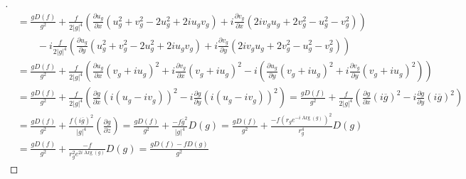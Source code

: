 \documentclass{article}
\begin{document}
\begin{proof}[\unskip \nopunct]
\begin{align*}
      &=\frac{g D(f)}{g^2} + \frac{f}{2|g|^4}\left(\frac{\partial u_g}{\partial x}(u_g^2 + v_g^2 - 2u_g^2 + 2iu_gv_g) + i\frac{\partial v_g}{\partial x}(2iv_gu_g + 2v_g^2 -u_g^2 - v_g^2)\right) \\ &\qquad -i\frac{f}{2|g|^4}\left(\frac{\partial u_g}{\partial y}(u_g^2 + v_g^2 - 2u_g^2 + 2iu_gv_g) + i\frac{\partial v_g}{\partial y}(2iv_gu_g + 2v_g^2 -u_g^2 - v_g^2)\right)\\
      &= \frac{g D(f)}{g^2} + \frac{f}{2|g|^4}\left(\frac{\partial u_g}{\partial x}(v_g +iu_g)^2 + i\frac{\partial v_g}{\partial x}(v_g +iu_g)^2 -i\left(\frac{\partial u_g}{\partial y}(v_g +iu_g)^2 + i\frac{\partial v_g}{\partial y}(v_g +iu_g)^2\right)\right)\\
      &= \frac{g D(f)}{g^2} + \frac{f}{2|g|^4}\left(\frac{\partial g}{\partial x}(i(u_g - iv_g))^2 -i\frac{\partial g}{\partial y}(i(u_g - iv_g))^2 \right) = \frac{g D(f)}{g^2} + \frac{f}{2|g|^4}\left(\frac{\partial g}{\partial x}(i\overline{g})^2 - i\frac{\partial g}{\partial y}(i\overline{g})^2\right) \\
      &=\frac{g D(f)}{g^2} + \frac{f(i\overline{g})^2}{|g|^4}\left(\frac{\partial g}{\partial z}\right)  =  \frac{g D(f)}{g^2} + \frac{-f\overline{g}^2}{|g|^4}D(g) =  \frac{g D(f)}{g^2} + \frac{-f(r_ge^{-i\operatorname{Arg}(g)})^2}{r_g^4}D(g) \\
      &=  \frac{g D(f)}{g^2} + \frac{-f}{r_g^2e^{2i\operatorname{Arg}(g)}}D(g)  = \frac{g D(f) -fD(g)}{g^2}
    \end{align*}
  \end{proof}
\end{document}
